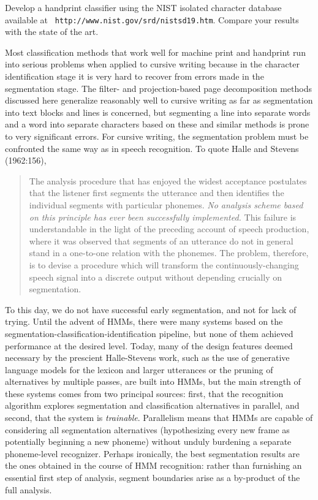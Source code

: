 \smallskip{} Develop a handprint
classifier using the NIST isolated character database available at {\tt
  http://www.nist.gov/srd/nistsd19.htm}. Compare your results with the state
of the art.

\medskip\noindent Most classification methods that work well for machine print
and handprint run into serious problems when applied to cursive writing
because in the character identification stage it is very hard to recover from
errors made in the segmentation stage. The filter- and projection-based page
decomposition methods discussed here generalize reasonably well to cursive
writing as far as segmentation into text blocks and lines is concerned, but
segmenting a line into separate words and a word into separate characters
based on these and similar methods is prone to very significant errors.  For
cursive writing, the segmentation problem must be confronted the same way as
in speech recognition. To quote Halle and Stevens
(1962:156),\nocite{Halle:1962}

\begin{quote}
The analysis procedure that has enjoyed the widest acceptance postulates that
the listener first segments the utterance and then identifies the individual
segments with particular phonemes. {\it No analysis scheme based on this
  principle has ever been successfully implemented.} This failure is
understandable in the light of the preceding account of speech production,
where it was observed that segments of an utterance do not in general stand in
a one-to-one relation with the phonemes. The problem, therefore, is to devise
a procedure which will transform the continuously-changing speech signal into
a discrete output without depending crucially on segmentation.
\end{quote}

\noindent
To this day, we do not have successful early segmentation, and not for lack of
trying. Until the advent of HMMs, there were many systems based on the
segmentation-classification-identification pipeline, but none of them achieved
performance at the desired level. Today, many of the design features deemed
necessary by the prescient Halle-Stevens work, such as the use of generative
language models for the lexicon and larger utterances or the pruning of
alternatives by multiple passes, are built into HMMs, but the main strength of
these systems comes from two principal sources: first, that the recognition
algorithm explores segmentation and classification alternatives in parallel,
and second, that the system is {\it trainable}. Parallelism means that HMMs
are capable of considering all segmentation alternatives (hypothesizing every
new frame as potentially beginning a new phoneme) without unduly burdening a
separate phoneme-level recognizer. Perhaps ironically, the best segmentation
results are the ones obtained in the course of HMM recognition: rather than
furnishing an essential first step of analysis, segment boundaries arise as a
by-product of the full analysis. 

